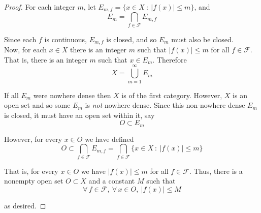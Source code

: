 \documentclass[12pt]{article}
\newlength\tindent
\renewcommand{\indent}{\hspace*{\tindent}}
\begin{document}
\begin{proof} For each integer $m$, let $E_{m,f} = \{x \in X ~:~ |f(x)| \leq m\}$, and 
\begin{equation*}
	E_m = \bigcap_{f\in\mathcal F} E_{m,f}
\end{equation*}

Since each $f$ is continuous, $E_{m,f}$ is closed, and so $E_m$ must also be closed. \\

\indent Now, for each $x \in X$ there is an integer $m$ such that $|f(x)| \leq m$ for all $f \in \mathcal F$. That is, there is an integer $m$ such that $x \in E_m$. Therefore
\begin{equation*}
	X = \bigcup^\infty_{m = 1} E_m
\end{equation*}

\indent If all $E_m$ were nowhere dense then $X$ is of the first category. However, $X$ is an open set and so some $E_m$ is {\em not} nowhere dense. Since this non-nowhere dense $E_m$ is closed, it must have an open set within it, say 
\begin{equation*}
	O \subset E_m
\end{equation*}

However, for every $x \in O$ we have defined 
\begin{equation*}
	O \subset \bigcap_{f\in\mathcal F} E_{m,f} = \bigcap_{f\in\mathcal F} \{x \in X ~:~ |f(x)| \leq m\}
\end{equation*}

\indent That is, for every $x \in O$ we have $|f(x)| \leq m$ for all $f \in \mathcal F$. Thus, there is a nonempty open set $O \subset X$ and a constant $M$ such that
\begin{equation*}
	\forall\,f\in\mathcal F,~\forall\,x\in O,~|f(x)| \leq M
\end{equation*}

as desired.

\end{proof}
\end{document}
